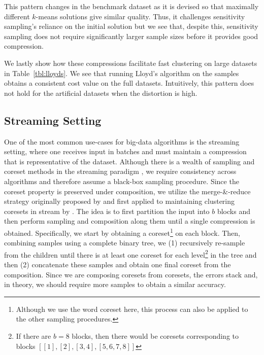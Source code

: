 This pattern changes in the benchmark dataset as it is devised so that maximally different $k$-means solutions give similar quality. Thus, it challenges
sensitivity sampling's reliance on the initial solution but we see that, despite this, sensitivity sampling does not require significantly larger sample sizes
before it provides good compression.

We lastly show how these compressions facilitate fast clustering on large datasets in Table~\ref{tbl:lloyds}. We see that running Lloyd's algorithm on
the samples obtains a consistent cost value on the full datasets. Intuitively, this pattern does not hold for the artificial datasets when the distortion is
high.




\subsection{Streaming Setting}
\label{ssec:streaming}

One of the most common use-cases for big-data algorithms is the streaming setting, where one receives input in batches and must maintain a compression that is
representative of the dataset. Although there is a wealth of sampling and coreset methods in the streaming paradigm , we require consistency
across algorithms and therefore assume a black-box sampling procedure. Since the coreset property is preserved under composition, we utilize the merge-\&-reduce
strategy originally proposed by \cite{BS80} and first applied to maintaining clustering coresets in stream by \cite{HaM01}. The idea is to first partition the
input into $b$ blocks and then perform sampling and composition along them until a single compression is obtained. Specifically, we start by obtaining
a coreset\footnote{Although we use the word coreset here, this process can also be applied to the other sampling procedures.} on each block. Then, combining
samples using a complete binary tree, we (1) recursively re-sample from the children until there is at least one coreset for each level\footnote{If there are
$b=8$ blocks, then there would be coresets corresponding to blocks $[[1], [2], [3, 4], [5, 6, 7, 8]]$} in the tree and then (2) concatenate these samples and
obtain one final coreset from the composition. Since we are composing coresets from coresets, the errors stack and, in theory, we should require more samples
to obtain a similar accuracy. 

